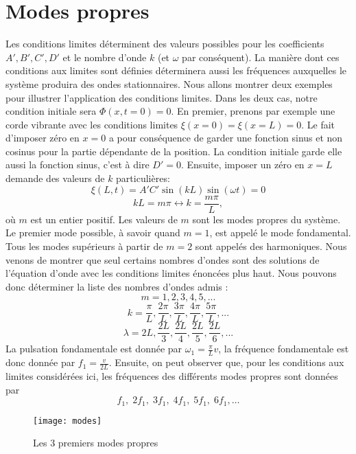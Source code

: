 \section{Modes propres}
Les conditions limites déterminent des valeurs possibles pour les coefficients $A', B', C', D'$ et le nombre d'onde $k$ (et $\omega$ par conséquent). La manière dont ces conditions aux limites sont définies déterminera aussi les fréquences auxquelles le système produira des ondes stationnaires.
Nous allons montrer deux exemples pour illustrer l'application des conditions limites. Dans les deux cas, notre condition initiale sera $\Phi(x,t=0)=0$. En premier, prenons par exemple une corde vibrante  avec les conditions limites $\xi(x=0)=\xi(x=L)=0$. Le fait d'imposer zéro en $x=0$ a pour conséquence de garder une fonction sinus et non cosinus pour la partie dépendante de la position. La condition initiale garde elle aussi la fonction sinus, c'est à dire $D'=0$. Ensuite, imposer un zéro en $x=L$ demande des valeurs de $k$ particulières: 
\[\xi(L,t)=A'C'\sin(kL)\sin(\omega t)=0\]
\[ kL = m\pi \leftrightarrow k=\frac{m\pi}{L},\] 
où $m$ est un entier positif. Les valeurs de $m$ sont les modes propres du système. Le premier mode possible, à savoir quand $m=1$, est appelé le mode fondamental. Tous les modes supérieurs à partir de $m=2$ sont appelés des harmoniques. Nous venons de montrer que seul certains nombres d'ondes sont des solutions de l'équation d'onde avec les conditions limites énoncées plus haut. Nous pouvons donc déterminer la liste des nombres d'ondes admis : 
$$ m = 1,2,3,4,5,...$$
$$ k = \frac{\pi}{L},\frac{2\pi}{L},\frac{3\pi}{L},\frac{4\pi}{L},\frac{5\pi}{L},...$$
$$ \lambda = 2L,\frac{2L}{3},\frac{2L}{4},\frac{2L}{5},\frac{2L}{6},... $$
La pulsation fondamentale est donnée par $\omega_1=\frac{\pi}{L}v$, la fréquence fondamentale est donc donnée par $f_1=\frac{v}{2L}$. Ensuite, on peut observer que, pour les conditions aux limites considérées ici, les fréquences des différents modes propres sont données par
$$ f_1,\; 2f_1,\; 3f_1,\; 4f_1,\; 5f_1,\; 6f_1, \ldots$$


\begin{figure}[h]\centering
	\texttt{[image: modes]}
	\caption{Les 3 premiers modes propres}
\end{figure}

